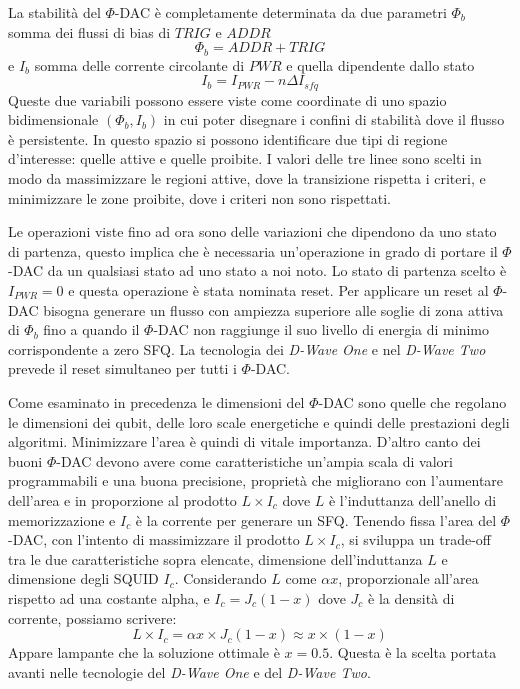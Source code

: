 La stabilità del $\Phi$-DAC è completamente determinata da due parametri $\Phi_b$ somma dei flussi di bias di $TRIG$ e $ADDR$ $$\Phi_b = ADDR + TRIG$$
e $I_b$ somma delle corrente circolante di $PWR$ e quella dipendente dallo stato
$$I_b = I_{PWR} -n \Delta I_{sfq}$$
Queste due variabili possono essere viste come coordinate di uno spazio bidimensionale $(\Phi_b, I_b)$ in cui poter disegnare i confini di stabilità dove il flusso è persistente. In questo spazio si possono identificare due tipi di regione d'interesse: quelle attive e quelle proibite. I valori delle tre linee sono scelti in modo da massimizzare le regioni attive, dove la transizione rispetta i criteri, e minimizzare le zone proibite, dove i criteri non sono rispettati.

\cite{ACI}Le operazioni viste fino ad ora sono delle variazioni che dipendono da uno stato di partenza, questo implica che è necessaria un'operazione in grado di portare il $\Phi$-DAC da un qualsiasi stato ad uno stato a noi noto. Lo stato di partenza scelto è $I_{PWR} = 0$ e questa operazione è stata nominata reset. Per applicare un reset al $\Phi$-DAC bisogna generare un flusso con ampiezza superiore alle soglie di zona attiva di $\Phi_b$ fino a quando il $\Phi$-DAC non raggiunge il suo livello di energia di minimo corrispondente a zero SFQ. La tecnologia dei \textit{D-Wave One} e nel \textit{D-Wave Two} prevede il reset simultaneo per tutti i $\Phi$-DAC.

Come esaminato in precedenza le dimensioni del $\Phi$-DAC sono quelle che regolano le dimensioni dei qubit, delle loro scale energetiche e quindi delle prestazioni degli algoritmi. Minimizzare l'area è quindi di vitale importanza. D'altro canto dei buoni $\Phi$-DAC devono avere come caratteristiche un'ampia scala di valori programmabili e una buona precisione, proprietà che migliorano con l'aumentare dell'area e in proporzione al prodotto $L \times I_c$ dove $L$ è l'induttanza dell'anello di memorizzazione e $I_c$ è la corrente per generare un SFQ. Tenendo fissa l'area del $\Phi$-DAC, con l'intento di massimizzare il prodotto $L \times I_c$, si sviluppa un trade-off tra le due caratteristiche sopra elencate, dimensione dell'induttanza $L$ e dimensione degli SQUID $I_c$. Considerando $L$ come $\alpha x$, proporzionale all'area rispetto ad una costante alpha, e $I_c = J_c (1-x)$ dove $J_c$ è la densità di corrente, possiamo scrivere:
$$ L \times I_c = \alpha x \times J_c (1-x) \approx x \times (1 - x)$$
Appare lampante che la soluzione ottimale è $x = 0.5$. Questa è la scelta portata avanti nelle tecnologie del \textit{D-Wave One} e del \textit{D-Wave Two}.

